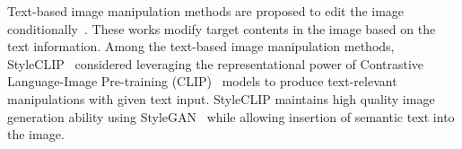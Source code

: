\documentclass[10pt,twocolumn,letterpaper]{article}
\def\authornote#1#2#3{{\textcolor{#2}{\textsl{\small[#1: #3]}}}}
\newcommand{\wonmin}[1]{\authornote{Wonmin}{Blue}{#1}} %
\begin{document}
Text-based image manipulation methods are proposed to edit the image conditionally~\cite{el2019tell, jiang2021language, li2020manigan, nam2018tagan,xia2021tedigan}.
These works modify target contents in the image based on the text information.
Among the text-based image manipulation methods, StyleCLIP~\cite{Patashnik_2021_ICCV} considered leveraging the representational power of Contrastive Language-Image Pre-training (CLIP)~\cite{radford2learning} models to produce text-relevant manipulations with given text input. StyleCLIP maintains high quality image generation ability using StyleGAN~\cite{jeong2021tr} while allowing insertion of semantic text into the image. 

 
\end{document}
